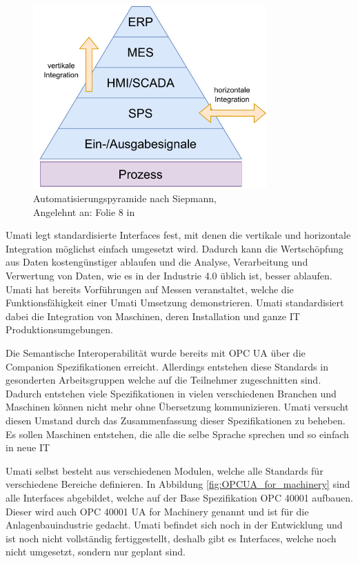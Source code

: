 \documentclass[a4paper, 12pt, oneside]{scrbook}
\begin{document}
		\begin{figure}[H]
			\centering
			\includegraphics[width=0.8\textwidth]{res/diagramms/Automatisierungspyramide.pdf}
			\caption{Automatisierungspyramide nach Siepmann, \\ Angelehnt an: Folie 8 in \cite{mielebacher_verteilte_2021}} 
			\label{fig:Automatisierungspyramide}
		\end{figure}
		
		Umati legt standardisierte Interfaces fest, mit denen die vertikale und horizontale Integration möglichst einfach umgesetzt wird. Dadurch kann die Wertschöpfung aus Daten kostengünstiger ablaufen und die Analyse, Verarbeitung und Verwertung von Daten, wie es in der Industrie 4.0 üblich ist, besser ablaufen. Umati hat bereits Vorführungen auf Messen veranstaltet, welche die Funktionsfähigkeit einer Umati Umsetzung demonstrieren. Umati standardisiert dabei die Integration von Maschinen, deren Installation und ganze IT Produktionsumgebungen. \cite{noauthor_about_nodate}
		
		
		Die Semantische Interoperabilität wurde bereits mit OPC UA über die Companion Spezifikationen erreicht. Allerdings entstehen diese Standards in gesonderten Arbeitsgruppen welche auf die Teilnehmer zugeschnitten sind. Dadurch entstehen viele Spezifikationen in vielen verschiedenen Branchen und Maschinen können nicht mehr ohne Übersetzung kommunizieren. Umati versucht diesen Umstand durch das Zusammenfassung dieser Spezifikationen zu beheben. Es sollen Maschinen entstehen, die alle die selbe Sprache sprechen und so einfach in neue IT 
		
		Umati selbst besteht aus verschiedenen Modulen, welche alle Standards für verschiedene Bereiche definieren. In Abbildung \ref{fig:OPCUA_for_machinery} sind alle Interfaces abgebildet, welche auf der Base Spezifikation OPC 40001 aufbauen. Dieser wird auch OPC 40001 UA for Machinery genannt und ist für die Anlagenbauindustrie gedacht. Umati befindet sich noch in der Entwicklung und ist noch nicht vollständig fertiggestellt, deshalb gibt es Interfaces, welche noch nicht umgesetzt, sondern nur geplant sind. \cite{noauthor_machinery_nodate}
		
\end{document}

